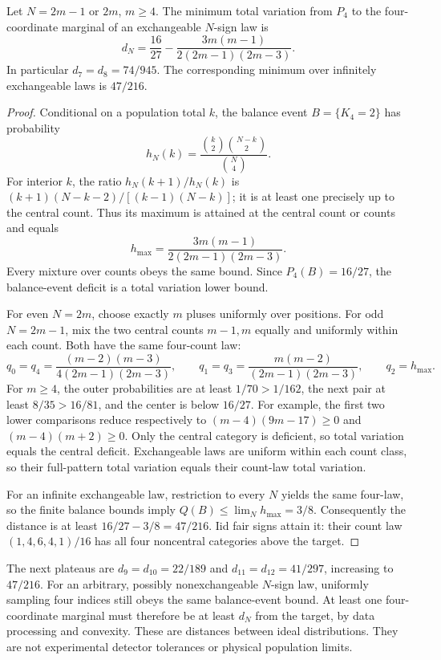 \begin{theorem}\label{fin:staircase}
Let \(N=2m-1\) or \(2m\), \(m\ge4\).
The minimum total variation from \(P_4\) to the four-coordinate
marginal of an exchangeable \(N\)-sign law is
\[
 d_N=\frac{16}{27}
 -\frac{3m(m-1)}{2(2m-1)(2m-3)}.
\]
In particular \(d_7=d_8=74/945\).
The corresponding minimum over infinitely exchangeable laws is
\(47/216\).
\end{theorem}
\begin{proof}
Conditional on a population total \(k\), the balance event \(B=\{K_4=2\}\)
has probability
\[
 h_N(k)=\frac{\binom k2\binom{N-k}2}{\binom N4}.
\]
For interior \(k\), the ratio \(h_N(k+1)/h_N(k)\) is
\((k+1)(N-k-2)/[(k-1)(N-k)]\); it is at least one precisely up to
the central count.  Thus its maximum is attained at the central
count or counts and equals
\[
 h_{\max}=\frac{3m(m-1)}{2(2m-1)(2m-3)}.
\]
Every mixture over counts obeys the same bound.
Since \(P_4(B)=16/27\), the balance-event deficit is a total variation
lower bound.

For even \(N=2m\), choose exactly \(m\) pluses uniformly over positions.
For odd \(N=2m-1\), mix the two central counts \(m-1,m\) equally and
uniformly within each count.  Both have the same four-count law:
\[
 q_0=q_4=\frac{(m-2)(m-3)}
                    {4(2m-1)(2m-3)},\qquad
 q_1=q_3=\frac{m(m-2)}{(2m-1)(2m-3)},\qquad q_2=h_{\max}.
\]
For \(m\ge4\), the outer probabilities are at least \(1/70>1/162\),
the next pair at least \(8/35>16/81\), and the center is below \(16/27\).
For example, the first two lower comparisons reduce respectively to
\((m-4)(9m-17)\ge0\) and \((m-4)(m+2)\ge0\).
Only the central category is deficient, so total variation equals
the central deficit.  Exchangeable laws are uniform within each count
class, so their full-pattern total variation equals their count-law
total variation.

For an infinite exchangeable law, restriction to every \(N\) yields
the same four-law, so the finite balance bounds imply
\(Q(B)\le\lim_Nh_{\max}=3/8\).
Consequently the distance is at least \(16/27-3/8=47/216\).
Iid fair signs attain it: their count law
\((1,4,6,4,1)/16\) has all four noncentral categories above the target.
\end{proof}

The next plateaus are \(d_9=d_{10}=22/189\) and
\(d_{11}=d_{12}=41/297\), increasing to \(47/216\).
For an arbitrary, possibly nonexchangeable \(N\)-sign law, uniformly
sampling four indices still obeys the same balance-event bound.
At least one four-coordinate marginal must therefore be at least
\(d_N\) from the target, by data processing and convexity.
These are distances between ideal distributions.  They are not
experimental detector tolerances or physical population limits.

